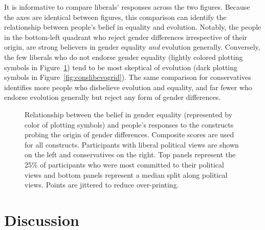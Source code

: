 \documentclass[fignum,man]{apa}\usepackage[]{graphicx}\usepackage[]{color}
\begin{document}
It is informative to compare liberals' responses across the two figures. Because
the axes are identical between figures, this comparison can identify the relationship
between people's belief in equality and evolution. Notably, the people in the bottom-left
quadrant who reject gender differences irrespective of their origin, are strong
believers in gender equality \textit{and }evolution generally. Conversely, the few
liberals who do not endorse gender equality (lightly colored plotting symbols in Figure~\ref{fig:conslibequalitygrid})
tend to be most skeptical of evolution (dark plotting symbols in 
Figure~\ref{fig:conslibevogrid}).
The same comparison for conservatives identifies more people who disbelieve evolution
and equality, and far fewer who endorse evolution generally but reject any
form of gender differences. 

\begin{figure}[tp] %
\caption{Relationship between the belief in gender equality (represented by
	color of plotting symbols) and people's responses to the constructs probing the
	origin of gender differences. 
	Composite scores are used for all constructs.
	Participants with liberal political
	views are shown on the left and conservatives on the right. Top panels
	represent the 25\% of participants who were most committed to their
	political views and bottom panels represent a median split
	along political views. Points are jittered to reduce over-printing.}
\label{fig:conslibequalitygrid}
\end{figure}

\section{Discussion}
\end{document}
